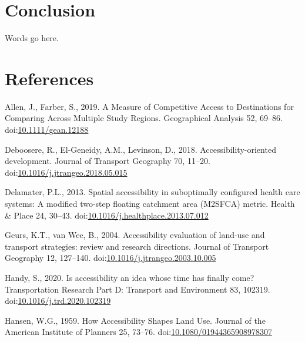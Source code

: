 \documentclass[]{elsarticle} %
\newlength{\cslhangindent}
\newlength{\cslentryspacingunit} %
\newenvironment{CSLReferences}[2] %
 {%
  \setlength{\parindent}{0pt}
  \ifodd #1
  \let\oldpar\par
  \def\par{\hangindent=\cslhangindent\oldpar}
  \fi
  \setlength{\parskip}{#2\cslentryspacingunit}
 }%
 {}
\begin{document}
\hypertarget{conclusion}{%
\section{Conclusion}\label{conclusion}}

Words go here.

\hypertarget{references}{%
\section*{References}\label{references}}

\hypertarget{refs}{}
\begin{CSLReferences}{1}{0}
\leavevmode{}%
Allen, J., Farber, S., 2019. A Measure of Competitive Access to
Destinations for Comparing Across Multiple Study Regions. Geographical
Analysis 52, 69--86.
doi:\href{https://doi.org/10.1111/gean.12188}{10.1111/gean.12188}

\leavevmode{}%
Deboosere, R., El-Geneidy, A.M., Levinson, D., 2018.
Accessibility-oriented development. Journal of Transport Geography 70,
11--20.
doi:\href{https://doi.org/10.1016/j.jtrangeo.2018.05.015}{10.1016/j.jtrangeo.2018.05.015}

\leavevmode{}%
Delamater, P.L., 2013. Spatial accessibility in suboptimally configured
health care systems: A modified two-step floating catchment area
(M2SFCA) metric. Health \& Place 24, 30--43.
doi:\href{https://doi.org/10.1016/j.healthplace.2013.07.012}{10.1016/j.healthplace.2013.07.012}

\leavevmode{}%
Geurs, K.T., van Wee, B., 2004. Accessibility evaluation of land-use and
transport strategies: review and research directions. Journal of
Transport Geography 12, 127--140.
doi:\href{https://doi.org/10.1016/j.jtrangeo.2003.10.005}{10.1016/j.jtrangeo.2003.10.005}

\leavevmode{}%
Handy, S., 2020. Is accessibility an idea whose time has finally come?
Transportation Research Part D: Transport and Environment 83, 102319.
doi:\href{https://doi.org/10.1016/j.trd.2020.102319}{10.1016/j.trd.2020.102319}

\leavevmode{}%
Hansen, W.G., 1959. How Accessibility Shapes Land Use. Journal of the
American Institute of Planners 25, 73--76.
doi:\href{https://doi.org/10.1080/01944365908978307}{10.1080/01944365908978307}


\end{CSLReferences}
\end{document}

